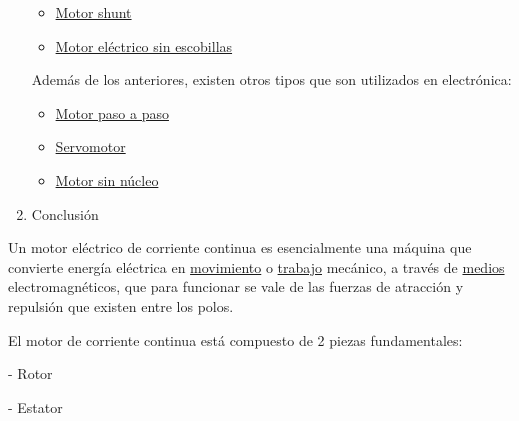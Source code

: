 \documentclass[12pt]{article}
\begin{document}
\begin{enumerate}
\begin{itemize}
	\item \href{http://es.wikipedia.org/wiki/Motor_shunt}{Motor shunt} \par

\setlength{\parskip}{14.04pt}
	\item \href{http://es.wikipedia.org/wiki/Motor_eléctrico_sin_escobillas}{Motor eléctrico sin escobillas} 
\end{itemize}\par

Además de los anteriores, existen otros tipos que son utilizados en electrónica:\par

\setlength{\parskip}{0.0pt}
\begin{itemize}
	\item \href{http://es.wikipedia.org/wiki/Motor_paso_a_paso}{Motor paso a paso} \par

	\item \href{http://es.wikipedia.org/wiki/Servomotor}{Servomotor} \par

\setlength{\parskip}{14.04pt}
	\item \href{http://es.wikipedia.org/wiki/Motor_sin_núcleo}{Motor sin núcleo} 
\end{itemize}\par

	\item Conclusión
\end{enumerate}\par

Un motor eléctrico de corriente continua es esencialmente una máquina que convierte energía eléctrica en \href{https://www.monografias.com/trabajos15/kinesiologia-biomecanica/kinesiologia-biomecanica.shtml}{movimiento} o \href{https://www.monografias.com/trabajos34/el-trabajo/el-trabajo.shtml}{trabajo} mecánico, a través de \href{https://www.monografias.com/trabajos14/medios-comunicacion/medios-comunicacion.shtml}{medios} electromagnéticos, que para funcionar se vale de las fuerzas de atracción y repulsión que existen entre los polos.\par

El motor de corriente continua está compuesto de 2 piezas fundamentales:\par

- Rotor\par

- Estator\par
\end{document}
